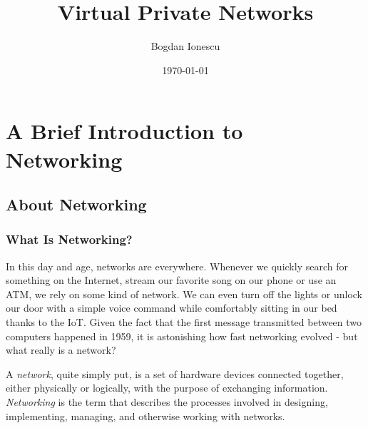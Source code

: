 \documentclass[a4paper,12pt]{report}
\begin{document}
	\title{Virtual Private Networks}
	\author{Bogdan Ionescu}
	\date{\today}
	\maketitle
	\tableofcontents
	
	\chapter{A Brief Introduction to Networking}
	\section{About Networking}
	\subsection{What Is Networking?}
		In this day and age, networks are everywhere. Whenever we quickly search for something on the Internet, stream our favorite song on our phone or use an ATM, we rely on some kind of network. We can even turn off the lights or unlock our door with a simple voice command while comfortably sitting in our bed thanks to the IoT. Given the fact that the first message transmitted between two computers happened in 1959, it is astonishing how fast networking evolved - but what really is a network? 

		A \textit{network}, quite simply put, is a set of hardware devices connected together, either physically or logically, with the purpose of exchanging information. \textit{Networking} is the term that describes the processes involved in designing, implementing, managing, and otherwise working with networks. 
\end{document}
